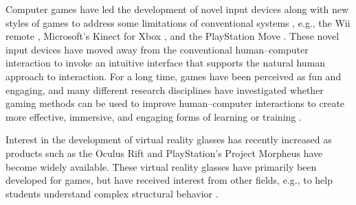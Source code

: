 Computer games have led the development of novel input devices along with new styles of games to address some limitations of conventional systems \cite{Kosmadoudi2013}, e.g., the Wii remote \cite{Nintendo}, Microsoft’s Kinect for Xbox \cite{Microsoft}, and the PlayStation Move \cite{Playstationa}. These novel input devices have moved away from the conventional human--computer interaction to invoke an intuitive interface that supports the natural human approach to interaction. For a long time, games have been perceived as fun and engaging, and many different research disciplines have investigated whether gaming methods can be used to improve human--computer interactions to create more effective, immersive, and engaging forms of learning or training \cite{Kosmadoudi2013}. 

Interest in the development of virtual reality glasses has recently increased as products such as the Oculus Rift \cite{Oculus} and PlayStation’s Project Morpheus \cite{Playstation} have become widely available. These virtual reality glasses have primarily been developed for games, but have received interest from other fields, e.g., to help students understand complex structural behavior \cite{fogarty2014exploring}.

